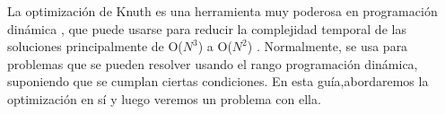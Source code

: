 La optimización de Knuth es una herramienta muy poderosa en programación dinámica , que puede usarse para reducir la complejidad temporal de las soluciones principalmente de O($N^3$) a O($N^2$) . Normalmente, se usa para problemas que se pueden resolver usando el rango programación dinámica, suponiendo que se cumplan ciertas condiciones. En esta guía,abordaremos la optimización en sí y luego veremos un problema con ella.